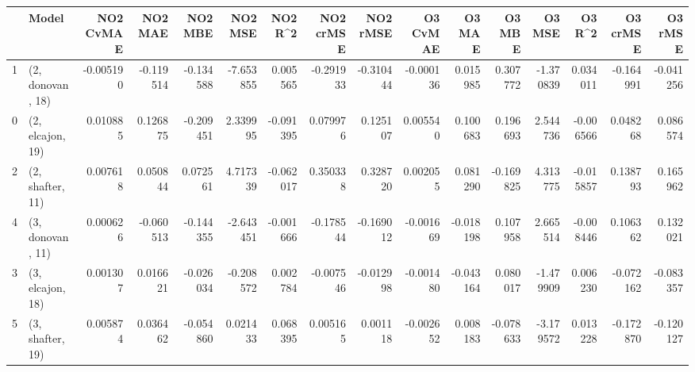 \begin{tabular}{llrrrrrrrrrrrrrr}
\toprule
{} &             Model &  NO2 CvMAE &   NO2 MAE &   NO2 MBE &   NO2 MSE &   NO2 R\textasciicircum2 &  NO2 crMSE &  NO2 rMSE &  O3 CvMAE &    O3 MAE &    O3 MBE &    O3 MSE &    O3 R\textasciicircum2 &  O3 crMSE &   O3 rMSE \\
\midrule
1 &  (2, donovan, 18) &  -0.005190 & -0.119514 & -0.134588 & -7.653855 &  0.005565 &  -0.291933 & -0.310444 & -0.000136 &  0.015985 &  0.307772 & -1.370839 &  0.034011 & -0.164991 & -0.041256 \\
0 &  (2, elcajon, 19) &   0.010885 &  0.126875 & -0.209451 &  2.339995 & -0.091395 &   0.079976 &  0.125107 &  0.005540 &  0.100683 &  0.196693 &  2.544736 & -0.006566 &  0.048268 &  0.086574 \\
2 &  (2, shafter, 11) &   0.007618 &  0.050844 &  0.072561 &  4.717339 & -0.062017 &   0.350338 &  0.328720 &  0.002055 &  0.081290 & -0.169825 &  4.313775 & -0.015857 &  0.138793 &  0.165962 \\
4 &  (3, donovan, 11) &   0.000626 & -0.060513 & -0.144355 & -2.643451 & -0.001666 &  -0.178544 & -0.169012 & -0.001669 & -0.018198 &  0.107958 &  2.665514 & -0.008446 &  0.106362 &  0.132021 \\
3 &  (3, elcajon, 18) &   0.001307 &  0.016621 & -0.026034 & -0.208572 &  0.002784 &  -0.007546 & -0.012998 & -0.001480 & -0.043164 &  0.080017 & -1.479909 &  0.006230 & -0.072162 & -0.083357 \\
5 &  (3, shafter, 19) &   0.005874 &  0.036462 & -0.054860 &  0.021433 &  0.068395 &   0.005165 &  0.001118 & -0.002652 &  0.008183 & -0.078633 & -3.179572 &  0.013228 & -0.172870 & -0.120127 \\
\bottomrule
\end{tabular}
